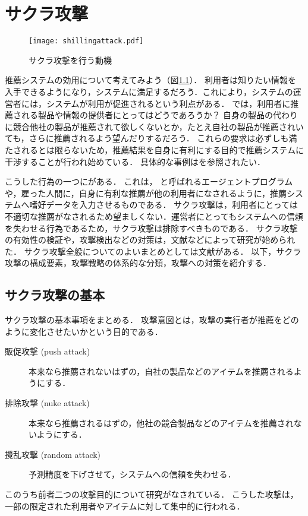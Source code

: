 \chapter{サクラ攻撃}
\label{chap:shilling}

\begin{figure}
\centering
\texttt{[image: shillingattack.pdf]}
\caption{サクラ攻撃を行う動機}
\label{fig:shilling-motivation}
\end{figure}

推薦システムの効用について考えてみよう（図\ref{fig:shilling-motivation}）．
利用者は知りたい情報を入手できるようになり，システムに満足するだろう．これにより，システムの運営者には，システムが利用が促進されるという利点がある．
では，利用者に推薦される製品や情報の提供者にとってはどうであろうか？
自身の製品の代わりに競合他社の製品が推薦されて欲しくないとか，たとえ自社の製品が推薦されいても，さらに推薦されるよう望んだりするだろう．
これらの要求は必ずしも満たされるとは限らないため，推薦結果を自身に有利にする目的で推薦システムに干渉することが行われ始めている．
具体的な事例は\cite{www:04:01}を参照されたい．

こうした行為の一つにがある．
これは， と呼ばれるエージェントプログラムや，雇った人間に，自身に有利な推薦が他の利用者になされるように，推薦システムへ嗜好データを入力させるものである．
サクラ攻撃は，利用者にとっては不適切な推薦がなされるため望ましくない．運営者にとってもシステムへの信頼を失わせる行為であるため，サクラ攻撃は排除すべきものである．
サクラ攻撃の有効性の検証や，攻撃検出などの対策は，文献\cite{jacm:04:02,www:04:01}などによって研究が始められた．
サクラ攻撃全般についてのよいまとめとしては文献\cite{ieeem:07:07}がある．
以下，サクラ攻撃の構成要素，攻撃戦略の体系的な分類，攻撃への対策を紹介する．

\section{サクラ攻撃の基本}
\label{sec:shilling:basics}

サクラ攻撃の基本事項をまとめる．
攻撃意図とは，攻撃の実行者が推薦をどのように変化させたいかという目的である．
\begin{description}
 \item[販促攻撃 (push attack)] 本来なら推薦されないはずの，自社の製品などのアイテムを推薦されるようにする．
 \item[排除攻撃 (nuke attack)] 本来なら推薦されるはずの，他社の競合製品などのアイテムを推薦されないようにする．
 \item[攪乱攻撃 (random attack)] 予測精度を下げさせて，システムへの信頼を失わせる．
\end{description}
このうち前者二つの攻撃目的について研究がなされている．
こうした攻撃は，一部の限定された利用者やアイテムに対して集中的に行われる．

